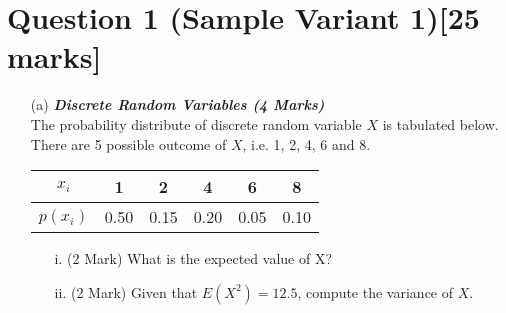 \documentclass[]{article}
\begin{document}
\newpage
\section*{Question 1 (Sample Variant 1)[25 marks]}
\begin{itemize}
\item[(a)] \textbf{\textit{Discrete Random Variables (4 Marks)}}\\ 
The probability distribute of discrete random variable $X$ is tabulated below. There are 5 possible outcome of $X$, i.e. 1, 2, 4, 6 and 8.
\begin{center}
\begin{tabular}{|c||c|c|c|c|c|}
\hline
$x_i$  & 1 & 2 & 4 & 6 & 8  \\\hline
$p(x_i)$ & 0.50 & 0.15 & 0.20 & 0.05 & 0.10 \\
\hline
\end{tabular}
\end{center}

\begin{itemize}
\item[i.] (2 Mark) What is the expected value of X?
\item[ii.] (2 Mark) Given that $E(X^2) = 12.5$, compute the variance of $X$.
\end{itemize}


\end{itemize}
\end{document}
